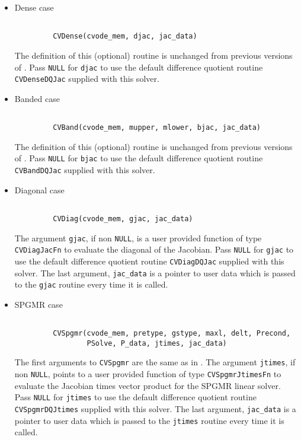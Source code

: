 \begin{itemize}

\item Dense case
\begin{verbatim}

         CVDense(cvode_mem, djac, jac_data)

\end{verbatim}

The definition of this (optional) routine is unchanged from previous 
versions of {\code}. Pass {\tt NULL} for {\tt djac} to use the default
difference quotient routine {\tt CVDenseDQJac} supplied with this solver.

\item Banded case
\begin{verbatim}

         CVBand(cvode_mem, mupper, mlower, bjac, jac_data)

\end{verbatim}

The definition of this (optional) routine is unchanged from previous 
versions of {\code}. Pass {\tt NULL} for {\tt bjac} to use the default
difference quotient routine {\tt CVBandDQJac} supplied with this solver.

\item Diagonal case
\begin{verbatim}

         CVDiag(cvode_mem, gjac, jac_data)

\end{verbatim}

The argument {\tt gjac}, if non {\tt NULL}, is a user provided
function of type {\tt CVDiagJacFn} to evaluate the diagonal of
the Jacobian. Pass {\tt NULL} for {\tt gjac} to use the default
difference quotient routine {\tt CVDiagDQJac} supplied with this solver.
The last argument, {\tt jac\_data} is a pointer to user data which is passed 
to the {\tt gjac} routine every time it is called.

\item SPGMR case
\begin{verbatim}

         CVSpgmr(cvode_mem, pretype, gstype, maxl, delt, Precond, 
                 PSolve, P_data, jtimes, jac_data)

\end{verbatim}
The first arguments to {\tt CVSpgmr} are the same as in {\code}. 
The argument {\tt jtimes}, if non {\tt NULL}, points to a user 
provided function of type {\tt CVSpgmrJtimesFn} to evaluate 
the Jacobian times vector product for the SPGMR linear solver.
Pass {\tt NULL} for {\tt jtimes} to use the default
difference quotient routine {\tt CVSpgmrDQJtimes} supplied with this solver.
The last argument, {\tt jac\_data} is a pointer to user data which is passed 
to the {\tt jtimes} routine every time it is called.

\end{itemize}

